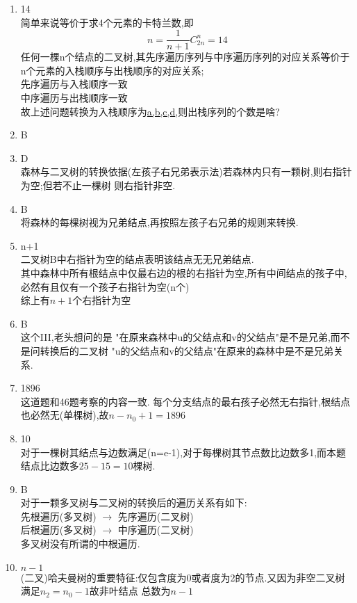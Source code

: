 \documentclass[12pt, a4paper, oneside, UTF8]{ctexbook}
\begin{document}
\begin{enumerate}
    \item 14 \\
    简单来说等价于求4个元素的卡特兰数,即
    $$
    n = \frac{1}{n+1}C_{2n}^{n} = 14
    $$ 
    任何一棵n个结点的二叉树,其先序遍历序列与中序遍历序列的对应关系等价于n个元素的入栈顺序与出栈顺序的对应关系; \\
    先序遍历与入栈顺序一致 \\
    中序遍历与出栈顺序一致 \\
    故上述问题转换为入栈顺序为\underline{a,b,c,d},则出栈序列的个数是啥?
    \item B
    \item D \\
    森林与二叉树的转换依据(左孩子右兄弟表示法)若森林内只有一颗树,则右指针为空;但若不止一棵树
    则右指针非空. 
    \item B \\
    将森林的每棵树视为兄弟结点,再按照左孩子右兄弟的规则来转换.
    \item n+1 \\
    二叉树B中右指针为空的结点表明该结点无无兄弟结点. \\
    其中森林中所有根结点中仅最右边的根的右指针为空,所有中间结点的孩子中,必然有且仅有一个孩子右指针为空(n个) \\
    综上有$n+1$个右指针为空 
    \item B \\
    这个III,老头想问的是 "在原来森林中u的父结点和v的父结点"是不是兄弟,而不是问转换后的二叉树
    "u的父结点和v的父结点"在原来的森林中是不是兄弟关系.
    \item 1896 \\
    这道题和46题考察的内容一致. 每个分支结点的最右孩子必然无右指针,根结点也必然无(单棵树),故$n-n_0+1=1896$
    \item 10 \\
    对于一棵树其结点与边数满足(n=e-1),对于每棵树其节点数比边数多1,而本题结点比边数多$25-15=10$棵树.
    \item B \\
    对于一颗多叉树与二叉树的转换后的遍历关系有如下: \\
    先根遍历(多叉树) $\rightarrow$ 先序遍历(二叉树) \\
    后根遍历(多叉树) $\rightarrow$ 中序遍历(二叉树) \\
    多叉树没有所谓的中根遍历. 
    \item $n-1$ \\
    (二叉)哈夫曼树的重要特征:仅包含度为0或者度为2的节点.又因为非空二叉树满足$n_2=n_0-1$故非叶结点
    总数为$n-1$

\end{enumerate}
\end{document}
